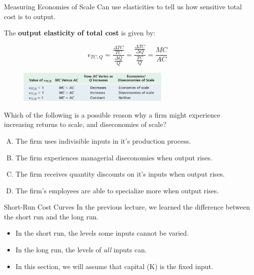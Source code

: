 \documentclass[11pt,t]{beamer}
\begin{document}
\begin{frame}{Measuring Economies of Scale}
  Can use elasticities to tell us how sensitive total cost is to output.

  The \textbf{output elasticity of total cost} is given by:

  $$
    \epsilon_{TC,Q}=\frac{\frac{\Delta TC}{TC}}{\frac{\Delta Q}{Q}}=\frac{\frac{\Delta TC}{\Delta Q}}{\frac{TC}{Q}}=\frac{MC}{AC}
  $$

  \bigskip
  \begin{figure}
    \includegraphics[width=280px]{figures/table8_3.jpg}
  \end{figure}
\end{frame}

\begin{frame}{}

  Which of the following is a possible reason why a firm might experience increasing returns to scale, and diseconomies of scale?

  \begin{enumerate}[A)]
    \item The firm uses indivisible inputs in it's production process.
    \item The firm experiences managerial diseconomies when output rises.
    \item The firm receives quantity discounts on it's inputs when output rises.
    \item The firm's employees are able to specialize more when output rises.
  \end{enumerate}
\end{frame}

\begin{frame}{Short-Run Cost Curves}
  In the previous lecture, we learned the difference between the short run and the long run.

  \begin{itemize}
    \item In the short run, the levels some inputs cannot be varied.
    
    \item In the long run, the levels of \textit{all} inputs can.
    
    \item In this section, we will assume that capital (K) is the fixed input.
  \end{itemize}
\end{frame}
\end{document}
